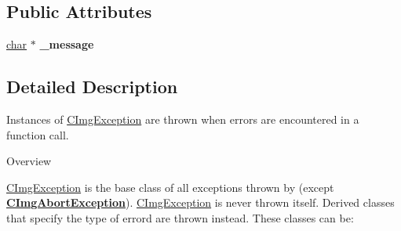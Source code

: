 \subsection*{Public Attributes}
\begin{DoxyCompactItemize}
\item 
\mbox{\label{structcimg__library__suffixed_1_1CImgException_a2d0626fd8caeca943cacb751fe1ea127}} 
\hyperlink{classchar}{char} $\ast$ {\bfseries \+\_\+message}
\end{DoxyCompactItemize}


\subsection{Detailed Description}
Instances of {\ttfamily \hyperlink{structcimg__library__suffixed_1_1CImgException}{C\+Img\+Exception}} are thrown when errors are encountered in a  function call. 

\begin{DoxyParagraph}{Overview}

\end{DoxyParagraph}
\hyperlink{structcimg__library__suffixed_1_1CImgException}{C\+Img\+Exception} is the base class of all exceptions thrown by  (except {\bfseries \hyperlink{structcimg__library__suffixed_1_1CImgAbortException}{C\+Img\+Abort\+Exception}}). \hyperlink{structcimg__library__suffixed_1_1CImgException}{C\+Img\+Exception} is never thrown itself. Derived classes that specify the type of errord are thrown instead. These classes can be\+:


